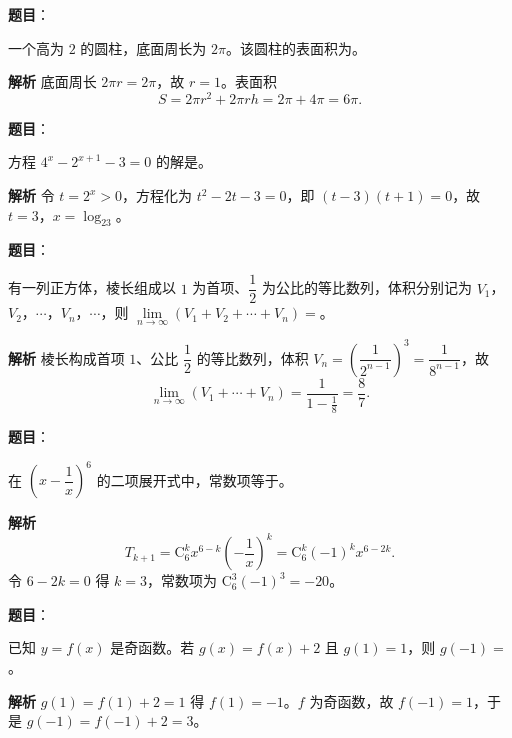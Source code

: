 \begin{answer}

\textbf{题目}：

一个高为 $2$ 的圆柱，底面周长为 $2\pi$。该圆柱的表面积为\gkblank{}。

\textbf{解析}
底面周长 $2\pi r=2\pi$，故 $r=1$。表面积
\nopagebreak[4]
\[S=2\pi r^2+2\pi rh=2\pi+4\pi=6\pi.\]


\end{answer}
\begin{answer}

\textbf{题目}：

方程 $4^x-2^{x+1}-3=0$ 的解是\gkblank{}。

\textbf{解析}
令 $t=2^x>0$，方程化为 $t^2-2t-3=0$，即 $(t-3)(t+1)=0$，故 $t=3$，$x=\log_23$。


\end{answer}
\begin{answer}

\textbf{题目}：

有一列正方体，棱长组成以 $1$ 为首项、$\dfrac12$ 为公比的等比数列，体积分别记为 $V_1$，$V_2$，$\cdots$，$V_n$，$\cdots$，则 $\lim\limits_{n\to\infty}(V_1+V_2+\cdots+V_n)=$\gkblank{}。

\textbf{解析}
棱长构成首项 $1$、公比 $\dfrac12$ 的等比数列，体积 $V_n=\left(\dfrac1{2^{n-1}}\right)^3=\dfrac1{8^{n-1}}$，故
\nopagebreak[4]
\[\lim_{n\to\infty}(V_1+\cdots+V_n)=\frac1{1-\frac18}=\frac87.\]


\end{answer}
\begin{answer}

\textbf{题目}：

在 $\left(x-\dfrac1x\right)^6$ 的二项展开式中，常数项等于\gkblank{}。

\textbf{解析}
\nopagebreak[4]
\[T_{k+1}=\mathrm C_6^kx^{6-k}\left(-\frac1x\right)^k=\mathrm C_6^k(-1)^kx^{6-2k}.\]
令 $6-2k=0$ 得 $k=3$，常数项为 $\mathrm C_6^3(-1)^3=-20$。


\end{answer}
\begin{answer}

\textbf{题目}：

已知 $y=f(x)$ 是奇函数。若 $g(x)=f(x)+2$ 且 $g(1)=1$，则 $g(-1)=$\gkblank{}。

\textbf{解析}
$g(1)=f(1)+2=1$ 得 $f(1)=-1$。$f$ 为奇函数，故 $f(-1)=1$，于是 $g(-1)=f(-1)+2=3$。


\end{answer}

